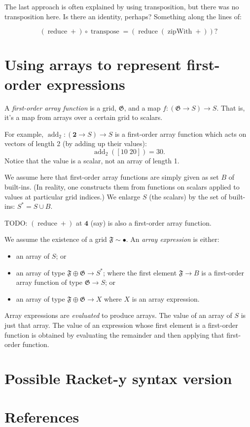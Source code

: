 \documentclass[11pt]{article}
\newcommand{\gr}[1]{\mathfrak{#1}}
\newcommand{\unit}{\bullet}
\DeclareMathOperator{\reduce}{reduce}
\DeclareMathOperator{\zipWith}{zipWith}
\begin{document}
The last approach is often explained by using transposition, but there was no
transposition here. Is there an identity, perhaps? Something along the lines of:

$$
(\reduce +) \circ \operatorname{transpose} = (\reduce (\zipWith +)) ? 
$$

\section{Using arrays to represent first-order expressions}
\label{sec:orgac340af}

A \emph{first-order array function} is a grid, \(\gr{G}\), and a map \(f: (\gr{G}\to
S)\to S\). That is, it's a map from arrays over a certain grid to scalars. 

For example, \(\operatorname{add}_2 : (\mathbf{2}\to S)\to S\) is a first-order
array function which acts on vectors of length 2 (by adding up their values):
$$
\operatorname{add}_2([10\; 20]) = 30.
$$ 
Notice that the value is a scalar, not an array of length 1.

We assume here that first-order array functions are simply given as set \(B\) of
built-ins.  (In reality, one constructs them from functions on scalars applied
to values at particular grid indices.) We enlarge \(S\) (the scalars) by the set
of built-ins: \(S^* = S\cup B\).

TODO: \((\reduce +)\) at \(\mathbf{4}\) (say) is also a first-order array function.  

We assume the existence of a grid \(\gr{F}\sim\unit\). An \emph{array expression} is
either:
\begin{itemize}
\item an array of \(S\); or
\item an array of type \(\gr{F}\oplus\gr{G}\to S^*\); where the first element
\(\gr{F}\to B\) is a first-order array function of type \(\gr{G}\to S\); or
\item an array of type \(\gr{F}\oplus\gr{G}\to X\) where \(X\) is an array expression.
\end{itemize}

Array expressions are \emph{evaluated} to produce arrays. The value of an array of
\(S\) is just that array. The value of an expression whose first element is a
first-order function is obtained by evaluating the remainder and then applying
that first-order function.

\section{Possible Racket-y syntax version}
\label{sec:orga1852e4}


\section{References}
\label{sec:orgbf56ab8}

\label{org334ac2d}


\label{orgefbceba}

\end{document}
